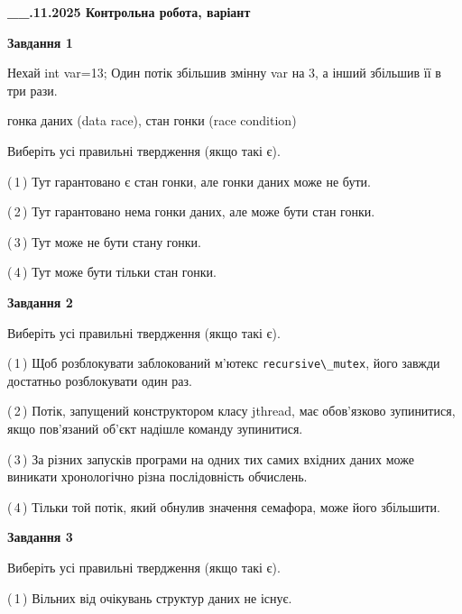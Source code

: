 \documentclass[12pt, ukrainian]{article}
\def\code#1{\Verb!#1!}
\begin{document}
\begin {large}

\textbf{\_\_.11.2025 Контрольна робота, варіант  }\par


{

\begin{center}
\textbf{Завдання 1}
\end{center}
Нехай int var=13; Один потік збільшив змінну var на 3, а інший збільшив її в три рази.

гонка даних (data race), стан гонки (race condition)

Виберіть усі правильні твердження (якщо такі є).\par
\vspace{2mm}
(\,1\,) Тут гарантовано є стан гонки, але гонки даних може не бути.%

(\,2\,) Тут гарантовано нема гонки даних, але може бути стан гонки.%

(\,3\,) Тут може не бути стану гонки.%

(\,4\,) Тут може бути тільки стан гонки.%



\begin{center}
\textbf{Завдання 2}
\end{center}
Виберіть усі правильні твердження (якщо такі є).\par
\vspace{2mm}

(\,1\,) Щоб розблокувати заблокований м’ютекс \code{recursive\_mutex}, його завжди достатньо розблокувати один раз.%

(\,2\,) Потік, запущений конструктором класу jthread, має обов’язково зупинитися, якщо пов’язаний об’єкт надішле команду зупинитися.%

(\,3\,) За різних запусків програми на одних тих самих вхідних даних може виникати хронологічно різна послідовність обчислень.%

(\,4\,) Тільки той потік, який обнулив значення семафора, може його збільшити.%



\begin{center}
\textbf{Завдання 3}
\end{center}
Виберіть усі правильні твердження (якщо такі є).\par
\vspace{2mm}

(\,1\,) Вільних від очікувань структур даних не існує.%

}
\end{large}
\end{document}
